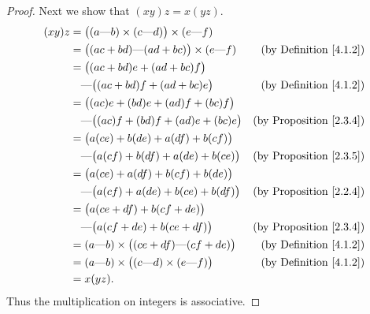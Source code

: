 \begin{proof}
    Next we show that \((xy)z = x(yz)\).
    \begin{align*}
        (xy)z & = \big((a \text{---} b) \times (c \text{---} d)\big) \times (e \text{---} f)                                       \\
              & = \big((ac + bd) \text{---} (ad + bc)\big) \times (e \text{---} f)           & \text{(by Definition \ref{4.1.2})}  \\
              & = \big((ac + bd)e + (ad + bc)f\big)                                                                                \\
              & \quad \text{---} \big((ac + bd)f + (ad + bc)e\big)                           & \text{(by Definition \ref{4.1.2})}  \\
              & = \big((ac)e + (bd)e + (ad)f + (bc)f\big)                                                                          \\
              & \quad \text{---} \big((ac)f + (bd)f + (ad)e + (bc)e\big)                     & \text{(by Proposition \ref{2.3.4})} \\
              & = \big(a(ce) + b(de) + a(df) + b(cf)\big)                                                                          \\
              & \quad \text{---} \big(a(cf) + b(df) + a(de) + b(ce)\big)                     & \text{(by Proposition \ref{2.3.5})} \\
              & = \big(a(ce) + a(df) + b(cf) + b(de)\big)                                                                          \\
              & \quad \text{---} \big(a(cf) + a(de) + b(ce) + b(df)\big)                     & \text{(by Proposition \ref{2.2.4})} \\
              & = \big(a(ce + df) + b(cf + de)\big)                                                                                \\
              & \quad \text{---} \big(a(cf + de) + b(ce + df)\big)                           & \text{(by Proposition \ref{2.3.4})} \\
              & = (a \text{---} b) \times \big((ce + df) \text{---} (cf + de)\big)           & \text{(by Definition \ref{4.1.2})}  \\
              & = (a \text{---} b) \times \big((c \text{---} d) \times (e \text{---} f)\big) & \text{(by Definition \ref{4.1.2})}  \\
              & = x(yz).
    \end{align*}
    Thus the multiplication on integers is associative.


\end{proof}
